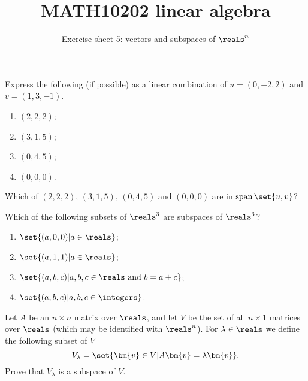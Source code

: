 \documentclass[english,12pt,a4paper]{scrartcl}
\title{MATH10202 linear algebra}
\subtitle{Exercise sheet 5: vectors and subspaces of $\reals^n$}
\author{}
\date{\vspace{-5ex}}
\renewcommand{\vec}[1]{\bm{#1}}
\newenvironment{modenumerate}
  {\enumerate\setupmodenumerate}
  {\endenumerate}
\newif\ifmoditem
\newcommand{\setupmodenumerate}{%
  \global\moditemfalse
  \let\origmakelabel\makelabel
  \def\moditem##1{\global\moditemtrue\def\mesymbol{##1}\item}%
  \def\makelabel##1{%
  \origmakelabel{##1\ifmoditem\rlap{\mesymbol}\fi\enspace}%
\global\moditemfalse}%
}
\DeclareMathOperator{\spn}{span}
\newcommand\spanset[1]{\ensuremath{\spn\set{#1}}}
\begin{document}
\maketitle

\begin{modenumerate}
  \moditem{*} Express the following (if possible) as a linear combination of $u 
  = (0, -2, 2)$ and $v = (1, 3, -1)$.
  \begin{multicols}{4}
    \begin{enumerate}
      \item $(2, 2, 2)$;
      \item $(3, 1, 5)$;
      \item $(0, 4, 5)$;
      \item $(0, 0, 0)$.
    \end{enumerate}
  \end{multicols}
  Which of $(2, 2, 2)$, $(3, 1, 5)$, $(0, 4, 5)$ and $(0, 0, 0)$ are in 
  $\spanset{u, v}$?
  \moditem{*} Which of the following subsets of $\reals^3$ are subspaces of 
  $\reals^3$?
  \begin{multicols}{2}
    \begin{enumerate}
      \item $\set{(a, 0, 0) | a \in \reals}$;
      \item $\set{(a, 1, 1) | a \in \reals}$;
      \item $\set{(a, b, c) | a, b, c \in \reals \text{ and } b = a + c}$;
      \item $\set{(a, b, c) | a, b, c \in \integers}$.
    \end{enumerate}
  \end{multicols}
  \moditem{*} Let $A$ be an $n \times n$ matrix over $\reals$, and let $V$ be 
  the set of all $n \times 1$ matrices over $\reals$ (which may be identified 
  with $\reals^n$). For $\lambda \in \reals$ we define the following subset of 
  $V$
  \[
    V_\lambda = \set{\vec{v} \in V | A\vec{v} = \lambda \vec{v}}.
  \]
  Prove that $V_\lambda$ is a subspace of $V$.
  

\end{modenumerate}
\end{document}
